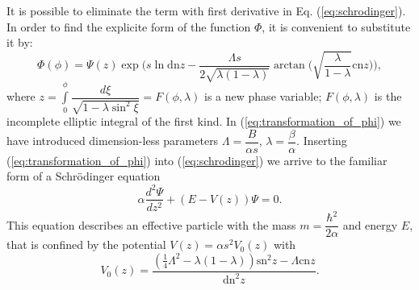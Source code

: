 \documentclass[fleqn,10pt]{wlscirep}
\newcommand{\sn}{\textrm{sn}}
\newcommand{\cn}{\textrm{cn}}
\newcommand{\dn}{\textrm{dn}}
\begin{document}
It is possible to eliminate the term with first derivative in Eq. (\ref{eq:schrodinger}).
In order to find the explicite form of the function $\Phi$, it is convenient to substitute it by:
%
\begin{equation}
\Phi(\phi) = \Psi(z) \exp \Big( s \ln \dn{z} - \dfrac{\Lambda s}{2 \sqrt{\lambda (1 - \lambda)}} \arctan \Big( \sqrt{\dfrac{\lambda}{1 - \lambda}} \cn{z} \Big) \Big),
\label{eq:transformation_of_phi}
\end{equation}
%
where $z = \int \limits_0^\phi \dfrac{d \xi}{\sqrt{1 - \lambda \sin^2 \xi}} = F(\phi, \lambda)$ is a new phase variable; $F(\phi, \lambda)$ is the incomplete elliptic integral of the first kind.
In (\ref{eq:transformation_of_phi}) we have introduced dimension-less parameters $\Lambda = \dfrac{B}{\alpha s}$, $\lambda = \dfrac{\beta}{\alpha}$.
Inserting (\ref{eq:transformation_of_phi}) into (\ref{eq:schrodinger}) we arrive to the familiar form of a Schr\"odinger equation
% 
\begin{equation}
\alpha \frac{d^2\Psi}{dz^2} + (E - V(z))\Psi = 0.
\label{eq:schrodinger_usual}
\end{equation}
%
This equation describes an effective particle with the mass  $m = \dfrac{\hbar^2}{2 \alpha}$ and energy $E$, that is confined by the potential $V(z) = \alpha s^2 V_0(z)$ with
%
\begin{equation}
V_0(z) = \frac{ (\frac{1}{4} \Lambda^2 - \lambda (1 - \lambda)) \sn^2{z} - \Lambda \cn{z}}{\dn^2{z}}.
\label{eq:potential}
\end{equation}
%
\end{document}
